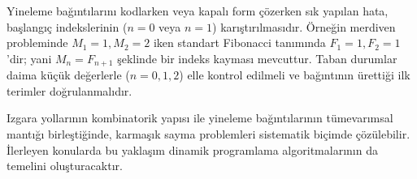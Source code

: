 \begin{definition}
Yineleme bağıntılarını kodlarken veya kapalı form çözerken sık yapılan hata, başlangıç indekslerinin ($n=0$ veya $n=1$) karıştırılmasıdır. Örneğin merdiven probleminde $M_1 = 1, M_2 = 2$ iken standart Fibonacci tanımında $F_1 = 1, F_2 = 1$'dir; yani $M_n = F_{n+1}$ şeklinde bir indeks kayması mevcuttur. Taban durumlar daima küçük değerlerle ($n=0, 1, 2$) elle kontrol edilmeli ve bağıntının ürettiği ilk terimler doğrulanmalıdır.
\end{definition}

Izgara yollarının kombinatorik yapısı ile yineleme bağıntılarının tümevarımsal mantığı birleştiğinde, karmaşık sayma problemleri sistematik biçimde çözülebilir. İlerleyen konularda bu yaklaşım dinamik programlama algoritmalarının da temelini oluşturacaktır.

